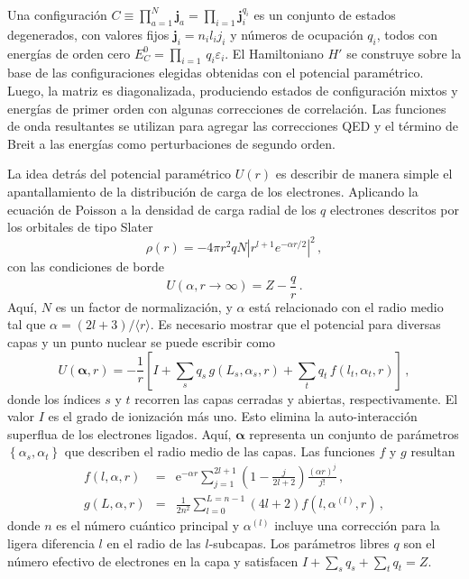 Una configuración 
$C\equiv\prod_{a=1}^N\mathbf{j}_a=\prod_{i=1}\mathbf{j}_i^{q_i}$ es un 
conjunto de estados degenerados, con valores fijos $\mathbf{j}_i=n_il_ij_i$
y números de ocupación $q_i$, todos con energías de orden cero 
$E_C^0=\prod_{i=1}\,q_i\varepsilon_i$. 
El Hamiltoniano $H'$ se construye sobre la base de las configuraciones 
elegidas obtenidas con el potencial paramétrico. Luego, la matriz es 
diagonalizada, produciendo estados de configuración mixtos y energías 
de primer orden con algunas correcciones de correlación. Las funciones 
de onda resultantes se utilizan para agregar las correcciones QED y el 
término de Breit a las energías como perturbaciones de segundo orden.

La idea detrás del potencial paramétrico $U(r)$ es describir de manera 
simple el apantallamiento de la distribución de carga de los electrones. 
Aplicando la ecuación de Poisson a la densidad de carga radial de los $q$
electrones descritos por los orbitales de tipo Slater
\begin{equation}
\rho(r) = -4\pi r^2 qN\left|r^{l+1}e^{-\alpha r/2}\right|^2\,,
\end{equation} 
con las condiciones de borde $$U(\alpha,r\rightarrow\infty)=Z-\frac{q}{r}\,.$$ Aquí,
$N$ es un factor de normalización, y $\alpha$ está relacionado con el 
radio medio tal que $\alpha=(2l+3)/\langle r\rangle$. Es necesario 
mostrar que el potencial para diversas capas y un punto nuclear se puede
escribir como
\begin{equation}
U(\boldsymbol{\alpha},r)=-\frac{1}{r} \left[I+\sum_s q_s\, g(L_s,\alpha_s,r) 
+ \sum_t q_t\,f(l_t,\alpha_t,r)\right]\,,
\label{eq:potparam}
\end{equation}
donde los índices $s$ y $t$ recorren las capas cerradas y abiertas, 
respectivamente. El valor $I$ es el grado de ionización más uno. Esto 
elimina la auto-interacción superflua de los electrones ligados. Aquí, 
$\boldsymbol{\alpha}$ representa un conjunto de parámetros 
$\left\{\alpha_s,\alpha_t\right\}$ que describen el radio medio de las 
capas. Las funciones $f$ y $g$ resultan
\begin{eqnarray}
f(l,\alpha,r)&=&\mathrm{e}^{-\alpha r} \sum_{j=1}^{2 l+1}\left(1-\frac{j}{2 l+2}\right) \frac{(\alpha r)^{j}}{j !}\,, \\
g(L, \alpha, r)&=&\frac{1}{2 n^{2}} \sum_{l=0}^{L=n-1}(4 l+2) f\left(l, \alpha^{(l)}, r\right)\,,
\end{eqnarray}
donde $n$ es el número cuántico principal y $\alpha^{(l)}$ incluye una
corrección para la ligera diferencia $l$ en el radio de las $l$-subcapas. 
Los parámetros libres $q$ son el número efectivo de electrones en la 
capa y satisfacen $I+\sum_{s} q_{s}+\sum_{t} q_{t}=Z$. 

